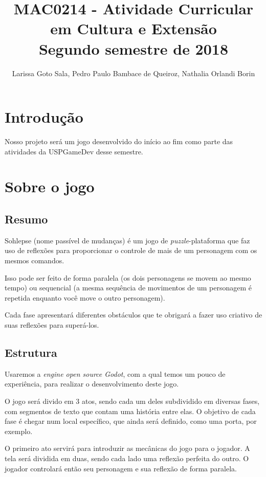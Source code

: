 \documentclass[a4paper, 11pt]{article}
\title{\textbf{MAC0214 - Atividade Curricular em Cultura e Extensão} \\ \small{Segundo semestre de 2018}}
\author{Larissa Goto Sala, Pedro Paulo Bambace de Queiroz, Nathalia Orlandi Borin}
\begin{document}
\maketitle

\newpage

\newpage

\section{Introdução}
	
	Nosso projeto será um jogo desenvolvido do início ao fim como parte das atividades da USPGameDev
	desse semestre.

\section{Sobre o jogo}
\subsection{Resumo}

	Sohlepse (nome passível de mudanças) é um jogo de \textit{puzzle}-plataforma que faz uso
 de reflexões para proporcionar o controle de mais de um personagem com os mesmos comandos.

 	Isso pode ser feito de forma paralela (os dois personagens se movem ao mesmo tempo) ou
 sequencial (a mesma sequência de movimentos de um personagem é repetida enquanto você
 move o outro personagem).

 	Cada fase apresentará diferentes obstáculos que te obrigará a fazer uso criativo de suas
 reflexões para superá-los.

\subsection{Estrutura}
	Usaremos a \textit{engine open source Godot}, com a qual temos um pouco de experiência, para realizar o desenvolvimento deste jogo.

	O jogo será divido em 3 atos, sendo cada um deles subdividido em diversas fases, com segmentos de texto que contam
uma história entre elas. O objetivo de cada fase é chegar num local específico, que ainda será definido, como uma porta,
por exemplo.

	O primeiro ato servirá para introduzir as mecânicas do jogo para o jogador. A tela será dividida em duas, sendo
cada lado uma reflexão perfeita do outro. O jogador controlará então seu personagem e sua reflexão de forma 
paralela.
\end{document}
